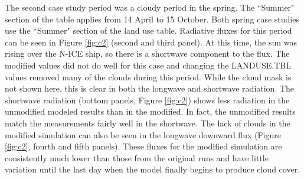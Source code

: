 The second case study period was a cloudy period in the spring. The ``Summer" section of the table applies from 14 April to 15 October. Both spring case studies use the ``Summer" section of the land use table. Radiative fluxes for this period can be seen in Figure \ref{fig:c2} (second and third panel). At this time, the sun was rising over the N-ICE ship, so there is a shortwave component to the flux. The modified values did not do well for this case and changing the LANDUSE.TBL values removed many of the clouds during this period. While the cloud mask is not shown here, this is clear in both the longwave and shortwave radiation. The shortwave radiation (bottom panels, Figure \ref{fig:c2}) shows less radiation in the unmodified modeled results than in the modified. In fact, the unmodified results match the measurements fairly well in the shortwave. The lack of clouds in the modified simulation can also be seen in the longwave downward flux (Figure \ref{fig:c2}, fourth and fifth panels). These fluxes for the modified simulation are consistently much lower than those from the original runs and have little variation until the last day when the model finally begins to produce cloud cover. 


